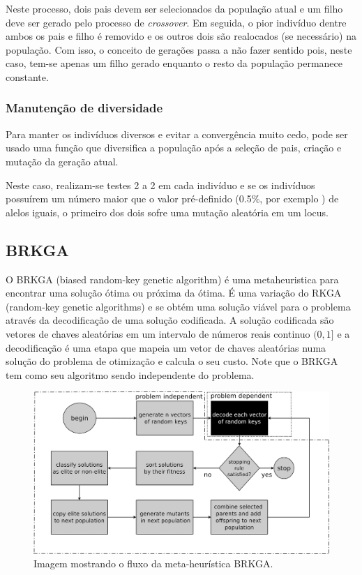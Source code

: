 \documentclass[conference]{IEEEtran}
\begin{document}
        Neste processo, dois pais devem ser selecionados da população atual e um filho deve ser gerado pelo processo de \emph{crossover}. Em seguida, o pior indivíduo dentre ambos os pais e filho é
        removido e os outros dois são realocados (se necessário) na população. Com isso, o conceito de gerações passa a não fazer sentido pois, neste caso, tem-se apenas um filho gerado enquanto o
        resto da população permanece constante.  

    \subsubsection{Manutenção de diversidade}

        Para manter os indivíduos diversos e evitar a convergência muito cedo, pode ser usado uma função que diversifica a população após a seleção de pais, criação e mutação da geração atual.

        Neste caso, realizam-se testes 2 a 2 em cada indivíduo e se os indivíduos possuírem um número maior que o valor pré-definido (0.5$\%$, por exemplo ) de alelos iguais, o primeiro dos
        dois sofre uma mutação aleatória em um locus.


\subsection{BRKGA}
\label{sec:alg_genetic}

    O BRKGA (biased random-key genetic algorithm)\cite{gonccalves2011biased} é uma metaheuristica para encontrar uma solução ótima ou próxima da ótima. É uma variação do RKGA
    (random-key genetic algorithms) \cite{bean1994genetic} e se obtém uma solução viável para o problema através da decodificação de uma solução codificada. A solução codificada são vetores de
    chaves aleatórias em um intervalo de números reais continuo $(0,1]$ e a decodificação é uma etapa que mapeia um vetor de chaves aleatórias numa solução do problema de otimização e calcula o
    seu custo. Note que o BRKGA tem como seu algoritmo sendo independente do problema. 
    
       \begin{figure}[!htb]
  \centering
 
  \includegraphics[scale=0.08]{imagens/brkga.jpg}
 \caption{Imagem mostrando o fluxo da meta-heurística BRKGA. \cite{gonccalves2014experimental}}
  \label{figura_brkga}
\end{figure}
\end{document}
